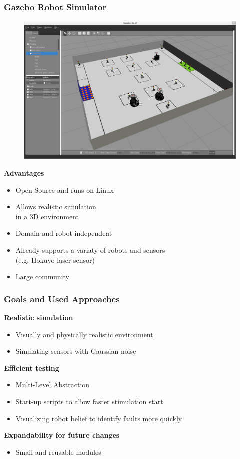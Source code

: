 \documentclass[]{beamer}
\begin{document}
\begin{frame}
  \frametitle{Gazebo Robot Simulator}
  \begin{multicols}{2}
    \begin{figure}
      \includegraphics[scale=0.11]{../pics/gazebo_window.png}
    \end{figure}
    \columnbreak
    \large{\textbf{Advantages}}
    \begin{itemize}
    \item Open Source and runs on Linux 
      \pause
    \item Allows realistic simulation\\ in a 3D environment
      \pause
    \item Domain and robot independent
      \pause
    \item Already supports a variaty of robots and sensors\\(e.g. Hokuyo laser sensor) 
      \pause
    \item Large community
    \end{itemize}
  \end{multicols}
\end{frame}

\begin{frame}
  \frametitle{Goals and Used Approaches}
  \large{\textbf{Realistic simulation}}
  \begin{itemize} 
  \item Visually and physically realistic environment
  \item Simulating sensors with Gaussian noise 
  \end{itemize} 
  \pause
  \large{\textbf{Efficient testing}}
  \begin{itemize} 
  \item Multi-Level Abstraction
  \item Start-up scripts to allow faster stimulation start
  \item Visualizing robot belief to identify faults more quickly
  \end{itemize} 
  \pause
  \large{\textbf{Expandability for future changes}}
  \begin{itemize} 
  \item Small and reusable modules
  \end{itemize}
\end{frame}
\end{document}
